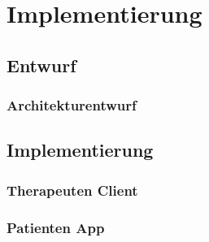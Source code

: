 \chapter{Implementierung}\label{Implementierung}
\section{Entwurf}
\subsection{Architekturentwurf}

\section{Implementierung}

\subsection{Therapeuten Client}

\subsection{Patienten App}